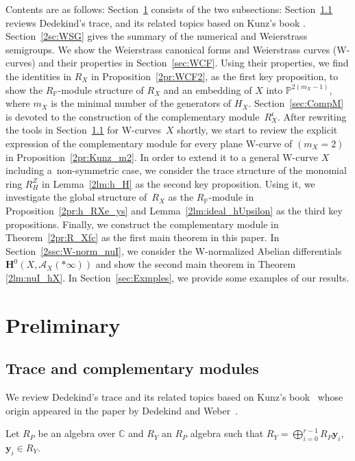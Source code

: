 \documentclass[pdftex]{sigma}
\def\CC{{\mathbb C}}
\def\PP{{\mathbb P}}
\def\bH{{\mathbf F}}
\def\bH{{\mathbf H}}
\def\bby{{\mathbf y}}
\def\cA{{\mathcal A}}
\def\fc{{\mathfrak c}}
\numberwithin{equation}{section}
\begin{document}
Contents are as follows:
Section~\ref{sec:preliminary} consists of the two subsections:
Section~\ref{2sc:App_trace} reviews Dedekind's trace, and its related topics based on Kunz's book \cite{Kunz2004}.
Section~\ref{2sc:WSG} gives the summary of the numerical and Weierstrass semigroups.
We show the Weierstrass canonical forms and Weierstrass curves (W-curves) and their properties in Section~\ref{sec:WCF}.
Using their properties, we find the identities in $R_X$ in Proposition~\ref{2pr:WCF2}, as the first key proposition, to show the $R_\PP$-module structure of $R_X$ and an embedding of $X$ into $\PP^{2(m_X-1)}$, where $m_X$ is the minimal number of the generators of $H_X$.
Section~\ref{sec:CompM} is devoted to the construction of the complementary module~$R_X^\fc$.
After rewriting the tools in Section~\ref{2sc:App_trace} for W-curves~$X$ shortly, we start to review the explicit expression of the complementary module for every plane W-curve of $(m_X=2)$ \cite[Theorem~15.1]{Kunz2004} in Proposition~\ref{2pr:Kunz_m2}.
In order to extend it to a general W-curve $X$ including a~non-symmetric case, we consider the trace structure of the monomial ring $R_H^Z$ in Lemma~\ref{2lm:h_H} as the second key proposition.
Using it, we investigate the global structure of~$R_X$ as the $R_\PP$-module in Proposition~\ref{2pr:h_RXe_ys} and Lemma~\ref{2lm:ideal_hUpsilon} as the third key propositions.
Finally, we construct the complementary module in Theorem~\ref{2pr:R_Xfc} as the first main theorem in this paper.
In Section~\ref{2ssc:W-norm_nuI}, we consider the W-normalized Abelian differentials $\bH^0(X, \cA_X(*\infty))$ and show the second main theorem in Theorem \ref{2lm:nuI_hX}.
In Section~\ref{sec:Exmples}, we provide some examples of our results.

\section{Preliminary}\label{sec:preliminary}

\subsection{Trace and complementary modules}\label{2sc:App_trace}

We review Dedekind's trace and its related topics based on Kunz's book~\cite{Kunz2004} whose origin appeared in the paper by Dedekind and Weber~\cite{DedekindWeber}.

Let $R_P$ be an algebra over $\CC$ and $R_Y$ an $R_P$ algebra such that
$R_Y=\bigoplus_{i=0}^{r-1}R_P\bby_i$, $\bby_i\in R_Y$.
\end{document}

